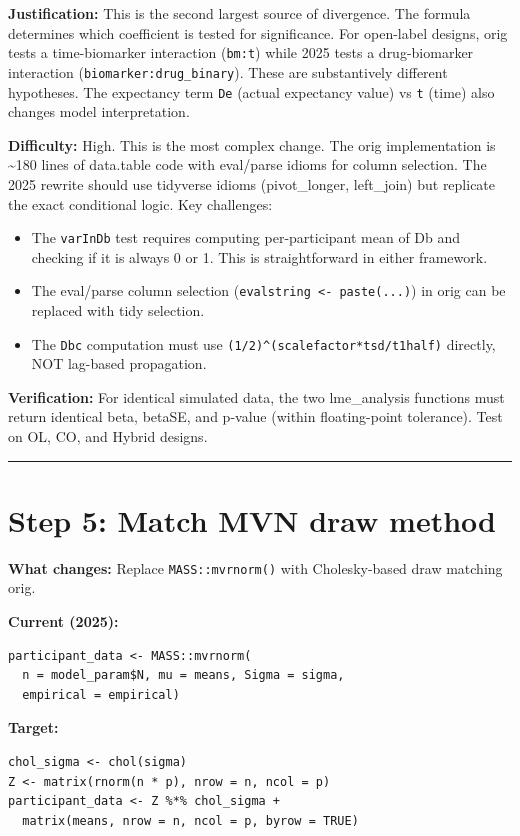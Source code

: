 \documentclass[11pt]{article}
\begin{document}
\textbf{Justification:} This is the second largest source of divergence.
The formula determines which coefficient is tested for significance.
For open-label designs, orig tests a time-biomarker interaction
(\texttt{bm:t}) while 2025 tests a drug-biomarker interaction
(\texttt{biomarker:drug\_binary}). These are substantively different
hypotheses. The expectancy term \texttt{De} (actual expectancy value) vs
\texttt{t} (time) also changes model interpretation.

\textbf{Difficulty:} High. This is the most complex change. The orig
implementation is \textasciitilde 180 lines of data.table code with eval/parse
idioms for column selection. The 2025 rewrite should use
tidyverse idioms (pivot\_longer, left\_join) but replicate the
exact conditional logic. Key challenges:

\begin{itemize}
  \item The \texttt{varInDb} test requires computing per-participant mean of Db
    and checking if it is always 0 or 1. This is straightforward in
    either framework.
  \item The eval/parse column selection (\texttt{evalstring <- paste(...)}) in
    orig can be replaced with tidy selection.
  \item The \texttt{Dbc} computation must use \texttt{(1/2)\^{}(scalefactor*tsd/t1half)}
    directly, NOT lag-based propagation.
\end{itemize}

\textbf{Verification:} For identical simulated data, the two
lme\_analysis functions must return identical beta, betaSE, and
p-value (within floating-point tolerance). Test on OL, CO, and
Hybrid designs.

\bigskip\noindent\rule{\textwidth}{0.4pt}\bigskip

\section{Step 5: Match MVN draw method}

\textbf{What changes:} Replace \texttt{MASS::mvrnorm()} with Cholesky-based
draw matching orig.

\textbf{Current (2025):}
\begin{lstlisting}
participant_data <- MASS::mvrnorm(
  n = model_param$N, mu = means, Sigma = sigma,
  empirical = empirical)
\end{lstlisting}

\textbf{Target:}
\begin{lstlisting}
chol_sigma <- chol(sigma)
Z <- matrix(rnorm(n * p), nrow = n, ncol = p)
participant_data <- Z %*% chol_sigma +
  matrix(means, nrow = n, ncol = p, byrow = TRUE)
\end{lstlisting}
\end{document}
